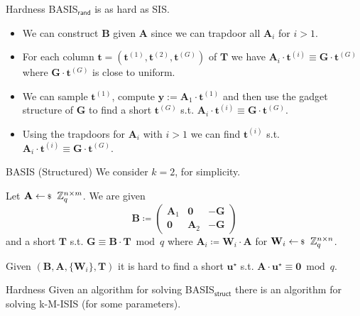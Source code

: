 \documentclass[xcolor=table,10pt,aspectratio=169]{beamer}
\renewcommand{\vec}[1]{\ensuremath{\mathbf{#1}}\xspace}
\providecommand{\mat}[1]{\ensuremath{\vec{#1}}\xspace}
\begin{document}
\begin{frame}[label={sec:orgc3a0c2b}]{Hardness}
BASIS\(_\mathsf{rand}\) is as hard as SIS.

\begin{itemize}
\item We can construct \(\vec{B}\) given \(\mat{A}\) since we can trapdoor all \(\mat{A}_{i}\) for \(i > 1\).

\item For each column \(\vec{t} = (\vec{t}^{(1)}, \vec{t}^{(2)}, \vec{t}^{(G)})\) of \(\vec{T}\) we have \(\mat{A}_{i} \cdot \vec{t}^{(i)} \equiv \vec{G} \cdot \vec{t}^{(G)}\) where \(\vec{G} \cdot \vec{t}^{(G)}\) is close to uniform.
\item We can sample \(\vec{t}^{(1)}\), compute \(\vec{y} := \mat{A}_{1} \cdot \vec{t}^{(1)}\) and then use the gadget structure of \(\vec{G}\) to find a short \(\vec{t}^{(G)}\) s.t. \(\mat{A}_{i} \cdot \vec{t}^{(i)} \equiv \vec{G} \cdot \vec{t}^{(G)}\).
\item Using the trapdoors for \(\mat{A}_{i}\) with \(i>1\) we can find \(\vec{t}^{(i)}\) s.t. \(\mat{A}_{i} \cdot \vec{t}^{(i)} \equiv \vec{G} \cdot \vec{t}^{(G)}\).
\end{itemize}
\end{frame}

\begin{frame}[label={sec:org3b112d2}]{BASIS (Structured)}
We consider \(k=2\), for simplicity.

\begin{definition}
Let \(\mat{A} \sample \ZZ_{q}^{n \times m}\). We are given
\[\vec{B} \coloneqq \begin{pmatrix}
\mat{A}_{1} & \vec{0} & - \vec{G}\\
\vec{0} & \mat{A}_{2} & -\vec{G}
\end{pmatrix}
\] and a short \(\vec{T}\) s.t. \(\vec{G} \equiv \vec{B} \cdot \vec{T} \bmod q\)
where \(\mat{A}_{i} \coloneqq  \vec{W}_{i} \cdot \mat{A}\) for \(\vec{W}_{i} \sample \ZZ_{q}^{n \times n}\).

Given \((\vec{B}, \mat{A}, \{\mat{W}_{i}\}, \vec{T})\) it is hard to find a short \(\vec{u}^{\star}\) s.t. \(\mat{A} \cdot \vec{u}^{\star} \equiv \vec{0} \bmod q\).
\end{definition}

{\footnotesize {} \par}
\end{frame}

\begin{frame}[label={sec:orga246425}]{Hardness}
Given an algorithm for solving BASIS\(_\mathsf{struct}\) there is an algorithm for solving k-M-ISIS (for some parameters).
\end{frame}
\end{document}

